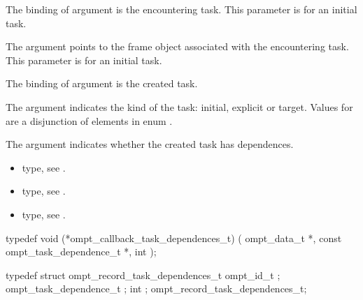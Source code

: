 \argdesc

The binding of argument  is the
encountering task.
This parameter is  for an initial task.

The argument  points to the frame object
associated with the encountering task.
This parameter is  for an initial task.

The binding of argument  is the created
task.

The argument  indicates the kind of the task: initial,
explicit or target.
Values for  are a disjunction of elements in enum
.

The argument  indicates whether the created
task has dependences.

\codeptrdesc

\crossreferences
\begin{itemize}
\item {} type, see
.
\item {} type, see
.
\item {} type, see
.
\end{itemize}



\label{sec:ompt_callback_task_dependences_t}
\format

\begin{ccppspecific}
\begin{omptCallback}
typedef void (*ompt_callback_task_dependences_t) (
  ompt_data_t *,
  const ompt_task_dependence_t *,
  int 
);
\end{omptCallback}
\end{ccppspecific}


\record

\begin{ccppspecific}
\begin{omptRecord}
typedef struct ompt_record_task_dependences_t {
  ompt_id_t ;
  ompt_task_dependence_t ;
  int ;
} ompt_record_task_dependences_t;
\end{omptRecord}
\end{ccppspecific}



